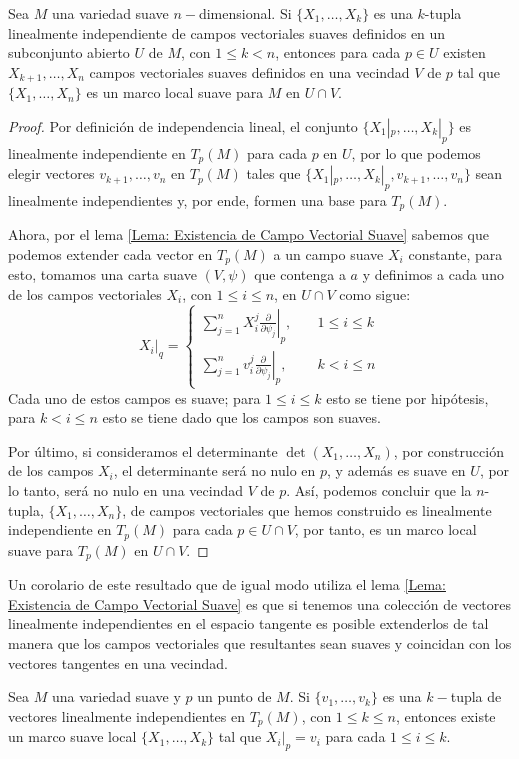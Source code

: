 \begin{theorem}
	Sea $M$ una variedad suave $n-$dimensional. Si $\{X_1, \ldots, X_k\}$ es una $k$-tupla linealmente independiente de campos vectoriales suaves definidos en un subconjunto abierto $U$ de $M$, con $1 \leq k < n$, entonces para cada $p \in U$ existen $X_{k+1},\ldots, X_n$ campos vectoriales suaves definidos en una vecindad $V$ de $p$ tal que $\{X_1, \ldots, X_n\}$ es un marco local suave para $M$ en $U \cap V$.
\end{theorem}

\begin{proof}
	Por definición de independencia lineal, el conjunto $\{X_1|_p, \ldots, X_k|_p\}$ es linealmente independiente en $T_p(M)$ para cada $p$ en $U$, por lo que podemos elegir vectores $v_{k+1},\ldots,v_n$ en $T_p(M)$ tales que $\{X_1|_p, \ldots, X_k|_p, v_{k+1}, \ldots, v_n\}$ sean linealmente independientes y, por ende, formen una base para $T_p(M)$.

  Ahora, por el lema \ref{Lema: Existencia de Campo Vectorial Suave} sabemos que podemos extender cada vector en $T_p(M)$ a un campo suave $X_i$ constante, para esto, tomamos una carta suave $(V,\psi)$ que contenga a $a$ y definimos a cada uno de los campos vectoriales $X_i$, con $1 \leq i \leq n$, en $U \cap V$ como sigue:
	\[
		\left. X_i \right|_q = \begin{cases}
			\sum_{j=1}^{n}
			\left.
			X_i^j \frac{\partial}{\partial \psi_j}
			\right|_p, & \quad 1 \leq i \leq k \\
			\sum_{j=1}^{n}
			\left.
			v_i^j \frac{\partial}{\partial \psi_j}
			\right|_p, & \quad k < i \leq n
		\end{cases}
	\]
	Cada uno de estos campos es suave; para $1 \leq i \leq k$ esto se tiene por hipótesis, para $k< i \leq n$ esto se tiene dado que los campos son suaves.

	Por último, si consideramos el determinante $\det(X_1, \ldots, X_n)$, por construcción de los campos $X_i$, el determinante será no nulo en $p$, y además es suave en $U$, por lo tanto, será no nulo en una vecindad $V$ de $p$. Así, podemos concluir que la $n$-tupla, $\{X_1,\ldots,X_n\}$, de campos vectoriales que hemos construido es linealmente independiente en $T_p(M)$ para cada $p \in U \cap V$, por tanto, es un marco local suave para $T_p(M)$ en $U \cap V$.
\end{proof}

Un corolario de este resultado que de igual modo utiliza el lema \ref{Lema: Existencia de Campo Vectorial Suave} es que si tenemos una colección de vectores linealmente independientes en el espacio tangente es posible extenderlos de tal manera que los campos vectoriales que resultantes sean suaves y coincidan con los vectores tangentes en una vecindad.

\begin{corollary}
  Sea $M$ una variedad suave y $p$ un punto de $M$. Si $\{v_1, \ldots, v_k\}$ es una $k-$tupla de vectores linealmente independientes en $T_p(M)$, con $1 \leq k \leq n$, entonces existe un marco suave local 
  $\{X_1, \ldots, X_k\}$ tal que $X_i|_p = v_i$ para cada $1\leq i \leq k$.
\end{corollary}

